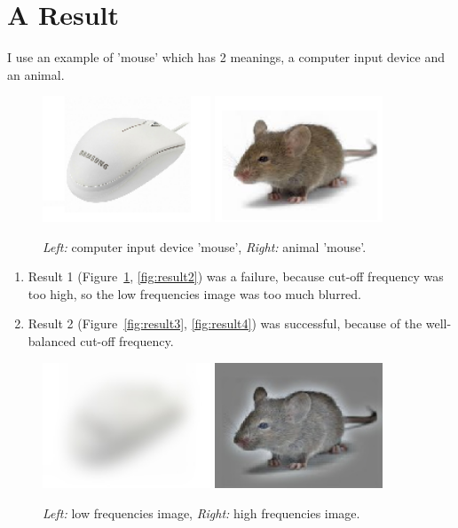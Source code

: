 \section*{A Result}

I use an example of 'mouse' which has 2 meanings, a computer input device and an animal.

\begin{figure}[h]
    \centering
    \includegraphics[width=5cm]{data/mouse2.png}
    \includegraphics[width=5cm]{data/mouse1.png}
    \caption{\emph{Left:} computer input device 'mouse',  \emph{Right:} animal 'mouse'.}
\end{figure}

\begin{enumerate}
    \item Result 1 (Figure~\ref{fig:result1}, \ref{fig:result2}) was a failure, because cut-off frequency was too high, so the low frequencies image was too much blurred.
    \item Result 2 (Figure~\ref{fig:result3}, \ref{fig:result4}) was successful, because of the well-balanced cut-off frequency.
\end{enumerate}


\begin{figure}[h]
    \centering
    \includegraphics[width=5cm]{questions/low_frequencies2.jpg}
    \includegraphics[width=5cm]{questions/high_frequencies2.jpg}
    \caption{\emph{Left:} low frequencies image,  \emph{Right:} high frequencies image.}
    \label{fig:result1}
\end{figure}

